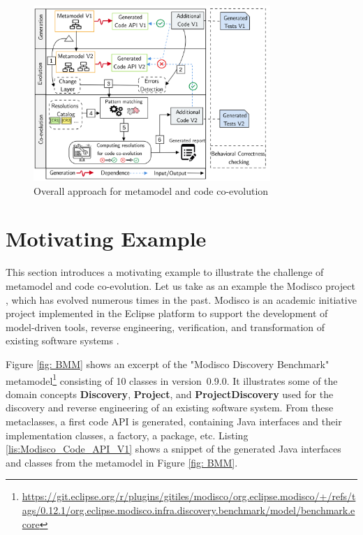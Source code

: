 
\begin{figure}[t]\centering%
	\centering
	\includegraphics[width=0.8\textwidth]{./pics/chapter1pics/ApproachV5.png}
	\caption{Overall approach for metamodel and code co-evolution}
	\label{fig:overallapproach}
	\vspace{-1em}
\end{figure}
\label{sec: ap1_changedetection}

\section{Motivating Example}\label{example}

This section introduces a motivating example to illustrate the challenge of metamodel and code co-evolution. 
Let us take as an example the Modisco project \cite{MDTModisco}, which has evolved numerous times in the past. Modisco is an academic initiative project implemented in the Eclipse platform to support the development of model-driven tools, reverse engineering, verification, and transformation of existing software systems \cite{bruneliere2010modisco,bruneliere2014modisco}.


Figure \ref{fig: BMM} shows an excerpt of the "Modisco Discovery Benchmark" metamodel\footnote{\url{https://git.eclipse.org/r/plugins/gitiles/modisco/org.eclipse.modisco/+/refs/tags/0.12.1/org.eclipse.modisco.infra.discovery.benchmark/model/benchmark.ecore}} consisting of 10 classes in version~0.9.0.
It illustrates some of the domain concepts \textbf{Discovery}, \textbf{Project}, and \textbf{ProjectDiscovery}  used for the discovery and reverse engineering of an existing software system. 
From these metaclasses, a first code API is generated, containing Java interfaces and their implementation classes, a factory, a package, etc. Listing \ref{lis:Modisco_Code_API_V1} shows a snippet of the generated Java interfaces and classes from the metamodel in Figure \ref{fig: BMM}. 

